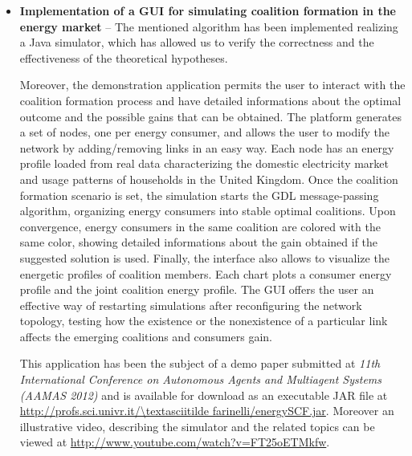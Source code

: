 \documentclass[11pt, twoside, titlepage, a4paper, openright]{report}
\begin{document}
\begin{itemize}
\item \textbf{Implementation of a GUI for simulating coalition formation in the energy market} -- The mentioned algorithm has been implemented realizing a Java simulator, which has allowed us to verify the correctness and the effectiveness of the theoretical hypotheses.

Moreover, the demonstration application permits the user to interact with the coalition formation process and have detailed informations about the optimal outcome and the possible gains that can be obtained.
The platform generates a set of nodes, one per energy consumer, and allows the user to modify
the network by adding/removing links in an easy way. Each node has an energy profile loaded from real data
characterizing the domestic electricity market and usage patterns of households in the United Kingdom.
Once the coalition formation scenario is set, the simulation starts the GDL message-passing algorithm, organizing energy consumers into stable optimal coalitions. Upon convergence, energy consumers in the same coalition are colored with the same color, showing detailed informations about the gain obtained if the suggested solution is used. 
Finally, the interface also allows to visualize the energetic profiles of coalition members.
Each chart plots a consumer energy profile and the joint coalition energy profile.  
The GUI offers the user an effective way of restarting simulations after reconfiguring the network
topology, testing how the existence or the nonexistence of a particular link affects the emerging
coalitions and consumers gain.

 This application has been the subject of a demo paper submitted at \textit{11th International Conference on Autonomous Agents and Multiagent Systems (AAMAS 2012)} \cite{bistaffa} and is available for download as an executable JAR file at \url{http://profs.sci.univr.it/\textasciitilde farinelli/energySCF.jar}. Moreover an illustrative video, describing the simulator and the related topics can be viewed at \url{http://www.youtube.com/watch?v=FT25oETMkfw}.
 

\end{itemize}
\end{document}
